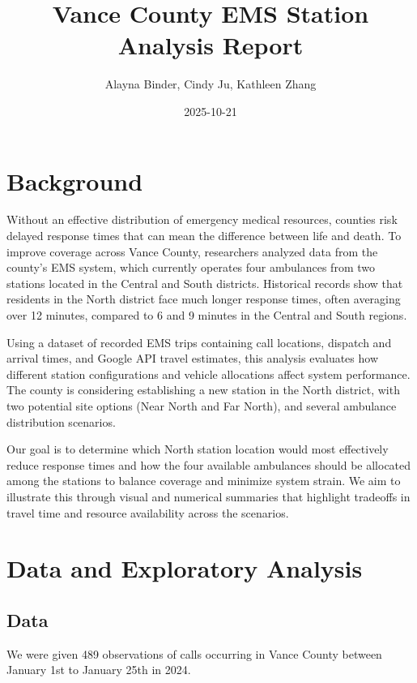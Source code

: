 \documentclass[
  11pt,
]{article}
\title{Vance County EMS Station Analysis Report}
\author{Alayna Binder, Cindy Ju, Kathleen Zhang}
\date{2025-10-21}
\begin{document}
\maketitle

{
\setcounter{tocdepth}{2}
\tableofcontents
}
\section{Background}\label{background}

Without an effective distribution of emergency medical resources,
counties risk delayed response times that can mean the difference
between life and death. To improve coverage across Vance County,
researchers analyzed data from the county's EMS system, which currently
operates four ambulances from two stations located in the Central and
South districts. Historical records show that residents in the North
district face much longer response times, often averaging over 12
minutes, compared to 6 and 9 minutes in the Central and South regions.

Using a dataset of recorded EMS trips containing call locations,
dispatch and arrival times, and Google API travel estimates, this
analysis evaluates how different station configurations and vehicle
allocations affect system performance. The county is considering
establishing a new station in the North district, with two potential
site options (Near North and Far North), and several ambulance
distribution scenarios.

Our goal is to determine which North station location would most
effectively reduce response times and how the four available ambulances
should be allocated among the stations to balance coverage and minimize
system strain. We aim to illustrate this through visual and numerical
summaries that highlight tradeoffs in travel time and resource
availability across the scenarios.

\section{Data and Exploratory
Analysis}\label{data-and-exploratory-analysis}

\subsection{Data}\label{data}

We were given 489 observations of calls occurring in Vance County
between January 1st to January 25th in 2024.
\end{document}
